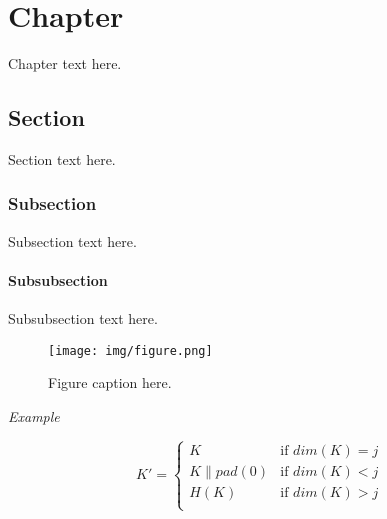 \chapter{Chapter}
\label{ch:chapter}
Chapter text here.


\section{Section}
Section text here.


\subsection{Subsection}
Subsection text here.


\subsubsection{Subsubsection}
Subsubsection text here.


\begin{figure}[h]
    \centering
    \texttt{[image: img/figure.png]}
    \decoRule
    \caption{Figure caption here.}
    \label{fig:figure}
\end{figure}


\vspace{0.5em}

\emph{Example}

\vspace{0.5em}


\begin{equation}
        K' = \begin{cases}
        K &\text{if $dim(K) = j$}\\
        K \parallel pad(0) &\text{if $dim(K) < j$}\\
        H(K) &\text{if $dim(K) > j$}\\
        \end{cases}
\end{equation}


